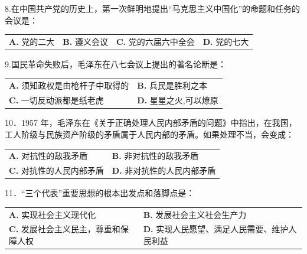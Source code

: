 \documentclass[UTF8,11pt]{ctexart}
\begin{document}
8.在中国共产党的历史上，第一次鲜明地提出“马克思主义中国化”的命题和任务的会议是：


\begin{center}\begin{tabular}{>{\raggedright\arraybackslash}p{\dimexpr(\linewidth-8\tabcolsep)/4\relax}>{\raggedright\arraybackslash}p{\dimexpr(\linewidth-8\tabcolsep)/4\relax}>{\raggedright\arraybackslash}p{\dimexpr(\linewidth-8\tabcolsep)/4\relax}>{\raggedright\arraybackslash}p{\dimexpr(\linewidth-8\tabcolsep)/4\relax}}
\textbf{A.} 党的二大 & \textbf{B.} 遵义会议 & \textbf{C.} 党的六届六中全会 & \textbf{D.} 党的七大\\[.35em]\end{tabular}\end{center}

9.国民革命失败后，毛泽东在八七会议上提出的著名论断是：


\begin{center}\begin{tabular}{>{\raggedright\arraybackslash}p{\dimexpr(\linewidth-4\tabcolsep)/2\relax}>{\raggedright\arraybackslash}p{\dimexpr(\linewidth-4\tabcolsep)/2\relax}}
\textbf{A.} 须知政权是由枪杆子中取得的 & \textbf{B.} 兵民是胜利之本\\[.35em]
\textbf{C.} 一切反动派都是纸老虎 & \textbf{D.} 星星之火,可以燎原\\[.35em]\end{tabular}\end{center}

10．1957 年，毛泽东在《关于正确处理人民内部矛盾的问题》中指出，在我国，工人阶级与民族资产阶级的矛盾属于人民内部的矛盾。如果处理不当，会变成：


\begin{center}\begin{tabular}{>{\raggedright\arraybackslash}p{\dimexpr(\linewidth-4\tabcolsep)/2\relax}>{\raggedright\arraybackslash}p{\dimexpr(\linewidth-4\tabcolsep)/2\relax}}
\textbf{A.} 对抗性的敌我矛盾 & \textbf{B.} 非对抗性的敌我矛盾\\[.35em]
\textbf{C.} 对抗性的人民内部矛盾 & \textbf{D.} 非对抗性的人民内部矛盾\\[.35em]\end{tabular}\end{center}

11．“三个代表”重要思想的根本出发点和落脚点是：


\begin{center}\begin{tabular}{>{\raggedright\arraybackslash}p{\dimexpr(\linewidth-4\tabcolsep)/2\relax}>{\raggedright\arraybackslash}p{\dimexpr(\linewidth-4\tabcolsep)/2\relax}}
\textbf{A.} 实现社会主义现代化 & \textbf{B.} 发展社会主义社会生产力\\[.35em]
\textbf{C.} 发展社会主义民主，尊重和保障人权 & \textbf{D.} 实现人民愿望、满足人民需要、维护人民利益\\[.35em]\end{tabular}\end{center}
\end{document}
